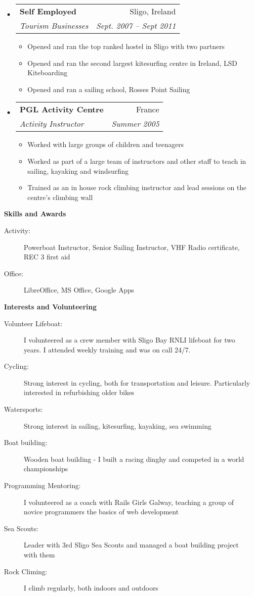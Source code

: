 \documentclass[letterpaper,11pt]{article}
\makeatletter
\newcommand{\resitem}[1]{\item #1 \vspace{-2pt}}
\newcommand{\resheading}[1]{{\large \colorbox{mygrey}{\begin{minipage}{\textwidth}{\textbf{#1 \vphantom{p\^{E}}}}\end{minipage}}}}
\newcommand{\ressubheading}[4]{
\begin{tabular*}{6.5in}{l@{\extracolsep{\fill}}r}
		\textbf{#1} & #2 \\
		\textit{#3} & \textit{#4} \\
\end{tabular*}\vspace{-6pt}}
\makeatother
\begin{document}
\begin{itemize}
		  \item 
      \ressubheading{Self Employed}{Sligo, Ireland}{Tourism Businesses}{Sept. 2007 -- Sept 2011}
        {
        \begin{itemize}
      	 \resitem{Opened and ran the top ranked hostel in Sligo with two partners}
        \resitem{Opened and ran the second largest kitesurfing centre in Ireland, LSD Kiteboarding}
        \resitem{Opened and ran a sailing school, Rosses Point Sailing}
        \end{itemize}
        }
        
      \item
      \ressubheading{PGL Activity Centre}{France}{Activity Instructor}{Summer 2005}
      {
        \begin{itemize}
        \resitem{Worked with large groups of children and teenagers}
        \resitem{Worked as part of a large team of instructors and other staff to teach in sailing, kayaking and windsurfing}
        \resitem{Trained as an in house rock climbing instructor and lead sessions on the centre's climbing wall}
        \end{itemize}
      }

	\end{itemize}  %




\resheading{Skills and Awards}
	\begin{description}
		\item[Activity:] Powerboat Instructor, Senior Sailing Instructor, VHF Radio certificate, REC 3 first aid
		\item[Office:] LibreOffice, MS Office, Google Apps 
	\end{description} %

\resheading{Interests and Volunteering}
	\begin{description}
		\item[Volunteer Lifeboat:] I volunteered as a crew member with Sligo Bay RNLI lifeboat for two years. I attended weekly training and was on call 24/7.
    \item[Cycling:] Strong interest in cycling, both for transportation and leisure. Particularly interested in refurbishing older bikes
    \item[Watersports:] Strong interest in sailing, kitesurfing, kayaking, sea swimming
		\item[Boat building:] Wooden boat building - I built a racing dinghy and competed in a world championships
		\item[Programming Mentoring:] I volunteered as a coach with Rails Girls Galway, teaching a group of novice programmers the basics of web development
		\item[Sea Scouts:] Leader with 3rd Sligo Sea Scouts and managed a boat building project with them
    \item[Rock Climing:] I climb regularly, both indoors and outdoors
	\end{description} %
\end{document}
